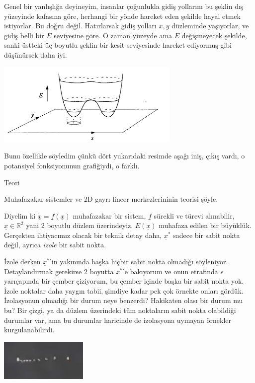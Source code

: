 \documentclass[12pt,fleqn]{article}\usepackage{../../common}
\begin{document}
Genel bir yanlışlığa deyineyim, insanlar çoğunlukla gidiş yollarını bu şeklin
dış yüzeyinde kafasına göre, herhangi bir yönde hareket eden şekilde hayal etmek
istiyorlar. Bu doğru değil. Hatırlarsak gidiş yolları $x,y$ düzleminde
yaşıyorlar, ve gidiş belli bir $E$ seviyesine göre. O zaman yüzeyde ama $E$
değişmeyecek şekilde, sanki üstteki üç boyutlu şeklin bir kesit seviyesinde
hareket ediyormuş gibi düşünürsek daha iyi.

\includegraphics[height=4cm]{07_14.png}

Bunu özellikle söyledim çünkü dört yukarıdaki resimde aşağı iniş, çıkış vardı,
o potansiyel fonksiyonunun grafiğiydi, o farklı.

Teori

Muhafazakar sistemler ve 2D gayrı lineer merkezlerininin teorisi şöyle.

Diyelim ki $\dot{\underline{x}}=\underline{f}(\underline{x})$ muhafazakar bir
sistem, $\underline{f}$ sürekli ve türevi alınabilir, $\underline{x} \in
\mathbb{R}^2$ yani 2 boyutlu düzlem üzerindeyiz. $E(\underline{x})$ muhafaza
edilen bir büyüklük. Gerçekten ihtiyacımız olacak bir teknik detay daha,
$\underline{x}^\ast$ sadece bir sabit nokta değil, ayrıca {\em izole} bir sabit
nokta.

İzole derken $\underline{x}^\ast$'in yakınında başka hiçbir sabit nokta olmadığı
söyleniyor. Detaylandırmak gerekirse 2 boyutta $\underline{x}^\ast$'e bakıyorum ve
onun etrafında $\epsilon$ yarıçapında bir çember çiziyorum, bu çember içinde
başka bir sabit nokta yok. İzole noktalar daha yaygın tabii, şimdiye kadar pek
çok örnekte onları gördük. İzolasyonun olmadığı bir durum neye benzerdi?
Hakikaten olası bir durum mu bu? Bir çizgi, ya da düzlem üzerindeki tüm
noktaların sabit nokta olabildiği durumlar var, ama bu durumlar haricinde de
izolasyona uymayan örnekler kurgulanabilirdi.

\includegraphics[height=2cm]{07_15.png}
\end{document}
